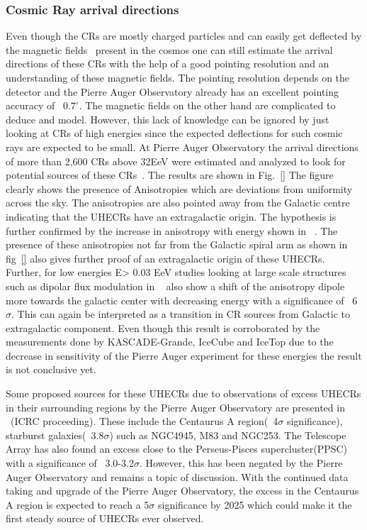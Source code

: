\subsubsection*{Cosmic Ray arrival directions}
\label{subsubsec:CRdirec}
Even though the CRs are mostly charged particles and can easily get deflected by the magnetic fields~\cite{} present in the cosmos one can still estimate the arrival directions of these CRs with the help of a good pointing resolution and an understanding of these magnetic fields. The pointing resolution depends on the detector and the Pierre Auger Observatory already has an excellent pointing accuracy of ~$0.7^{\circ}$. The magnetic fields on the other hand are complicated to deduce and model. However, this lack of knowledge can be ignored by just looking at CRs of high energies since the expected deflections for such cosmic rays are expected to be small. At Pierre Auger Observatory the arrival directions of more than 2,600 CRs above 32EeV were estimated and analyzed to look for potential sources of these CRs~\cite{}. The results are shown in Fig.~\ref{} The figure clearly shows the presence of Anisotropies which are deviations from uniformity across the sky. The anisotropies are also pointed away from the Galactic centre indicating that the UHECRs have an extragalactic origin. The hypothesis is further confirmed by the increase in anisotropy with energy shown in ~\cite{}. The presence of these anisotropies not far from the Galactic spiral arm as shown in fig~\ref{} also gives further proof of an extragalactic origin of these UHECRs. Further, for low energies E> 0.03 EeV studies looking at large scale structures such as dipolar flux modulation in ~\cite{} also show a shift of the anisotropy dipole more towards the galactic center with decreasing energy with a significance of ~6$\sigma$. This can again be interpreted as a transition in CR sources from Galactic to extragalactic component. Even though this result is corroborated by the measurements done by KASCADE-Grande, IceCube and IceTop due to the decrease in sensitivity of the Pierre Auger experiment for these energies the result is not conclusive yet.

Some proposed sources for these UHECRs due to observations of excess UHECRs in their surrounding regions by the Pierre Auger Observatory are presented in ~\cite{}(ICRC proceeding). These include the Centaurus A region(~4$\sigma$ significance), starburst galaxies(~3.8$\sigma$) such as NGC4945, M83 and NGC253. The Telescope Array has also found an excess close to the Perseus-Pisces supercluster(PPSC) with a significance of ~3.0-3.2$\sigma$. However, this has been negated by the Pierre Auger Observatory and remains a topic of discussion. With the continued data taking and upgrade of the Pierre Auger Observatory, the excess in the Centaurus A region is expected to reach a 5$\sigma$ significance by 2025 which could make it the first steady source of UHECRs ever observed. 
 

